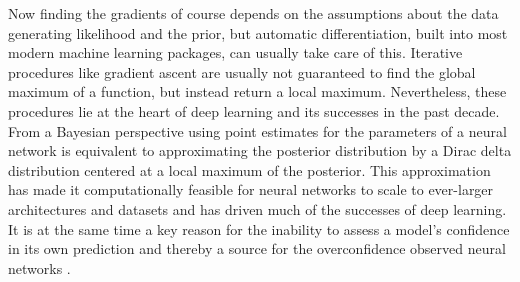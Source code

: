 \documentclass[../thesis.tex]{subfiles}
\begin{document}
Now finding the gradients of course depends on the assumptions about the data generating likelihood and the prior, but automatic differentiation, built into most modern machine learning packages, can usually take care of this. Iterative procedures like gradient ascent are usually not guaranteed to find the global maximum of a function, but instead return a local maximum. Nevertheless, these procedures lie at the heart of deep learning and its successes in the past decade. From a Bayesian perspective using point estimates for the parameters of a neural network is equivalent to approximating the posterior distribution by a Dirac delta distribution centered at a local maximum of the posterior. This approximation has made it computationally feasible for neural networks to scale to ever-larger architectures and datasets and has driven much of the successes of deep learning. It is at the same time a key reason for the inability to assess a model's confidence in its own prediction and thereby a source for the overconfidence observed neural networks \parencite{wilson2020case}.
\end{document}

